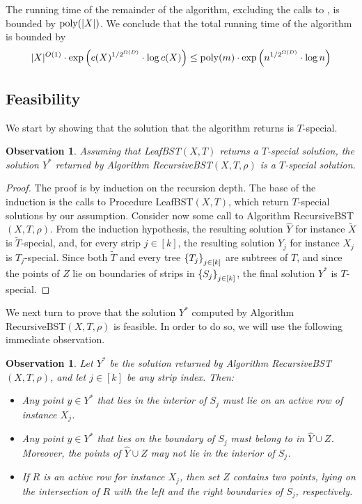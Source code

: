 \documentclass[11pt]{article}
\numberwithin{equation}{section}
\theoremstyle{definition}
\theoremstyle{plain}
\newtheorem{myobs}[theorem]{Observation}
\begin{document}
The running time of the remainder of the algorithm, excluding the calls to \leafBST, is bounded by $\operatorname{poly}(|X|)$. We conclude that the total running time of the algorithm is bounded by 
\[|X|^{O(1)}\cdot \exp\left({c(X)^{1/2^{\Omega(D)}}\cdot \log c(X)}\right )\leq \operatorname{poly}(m)\cdot \exp\left(n^{1/2^{\Omega(D)}}\cdot \log n \right )\] 


\subsection{Feasibility} 

We start by showing that the solution that the algorithm returns is $T$-special.

\begin{myobs}\label{obs: get special sol}
Assuming that {\sc LeafBST}$(X,T)$ returns a $T$-special solution, the solution $Y^*$ returned by Algorithm {\sc RecursiveBST}$(X,T,\rho)$ is  a $T$-special solution. 
\end{myobs}

\begin{proof}
    The proof is by induction on the recursion depth. The base of the induction is the calls to Procedure {\sc LeafBST}$(X,T)$, which return $T$-special solutions by our assumption.
Consider now some call to Algorithm {\sc RecursiveBST}$(X,T,\rho)$. From the induction hypothesis, the resulting solution $\hat{Y}$ for instance $\widetilde{X}$ is $\widetilde{T}$-special, and, for every strip $j \in [k]$, the resulting solution $Y_j$ for instance $X_j$ is $T_j$-special. 
Since both $\widetilde{T}$ and every tree $\left\{ T_j \right\}_{j \in [k]}$ are subtrees of $T$, and since the points of $Z$ lie on boundaries of strips in $\left\{ S_j \right\}_{j\in[k]}$, the final solution $Y^*$ is $T$-special. 
\end{proof}


%
%
%
%


We next turn to prove that the solution $Y^*$ computed by Algorithm {\sc RecursiveBST}$(X,T,\rho)$ is feasible. In order to do so, we will use the following immediate observation.



%
\begin{myobs}
	\label{obs:points structure} 
	Let $Y^*$ be the solution returned by Algorithm {\sc RecursiveBST}$(X,T,\rho)$, and let $j \in [k]$ be any strip index. Then:
	\begin{itemize}
		\item Any point $y\in Y^*$ that lies in the interior of $S_j$ must lie on an active row of instance $X_j$.
		\item Any point $y\in Y^*$ that lies on the boundary of $S_j$ must belong to in $\hat{Y}\cup Z$. Moreover, the points of $\hat{Y} \cup Z$ may not lie in the interior of $S_j$. 
\item If $R$ is an active row for instance $X_j$, then set $Z$ contains two points, lying on the intersection of $R$ with the left and the right boundaries of $S_j$, respectively.
		
%
	\end{itemize}
\end{myobs}
\end{document}
